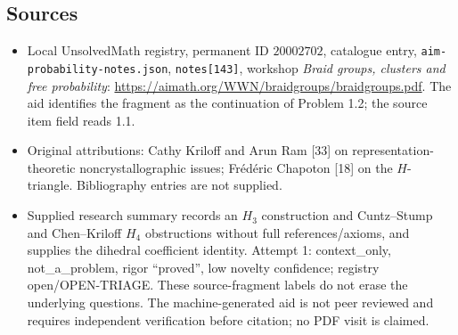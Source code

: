 \documentclass[11pt]{article}
\begin{document}
\subsection{Sources}
\begin{itemize}
\item Local UnsolvedMath registry, permanent ID \(20002702\), catalogue entry, \texttt{aim-probability-notes.json}, \texttt{notes[143]}, workshop \emph{Braid groups, clusters and free probability}: \url{https://aimath.org/WWN/braidgroups/braidgroups.pdf}. The aid identifies the fragment as the continuation of Problem 1.2; the source item field reads 1.1.
\item Original attributions: Cathy Kriloff and Arun Ram [33] on representation-theoretic noncrystallographic issues; Fr\'ed\'eric Chapoton [18] on the \(H\)-triangle. Bibliography entries are not supplied.
\item Supplied research summary records an \(H_3\) construction and Cuntz--Stump and Chen--Kriloff \(H_4\) obstructions without full references/axioms, and supplies the dihedral coefficient identity. Attempt 1: context\_only, not\_a\_problem, rigor ``proved'', low novelty confidence; registry open/OPEN-TRIAGE. These source-fragment labels do not erase the underlying questions. The machine-generated aid is not peer reviewed and requires independent verification before citation; no PDF visit is claimed.
\end{itemize}
\end{document}
